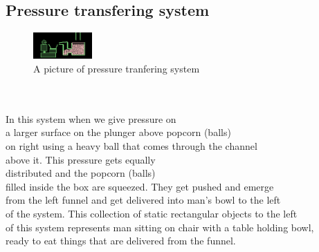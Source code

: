 \subsection{Pressure transfering system}
\begin{figure}
	\caption{A picture of pressure tranfering system}
	\centering
	 \includegraphics[width=0.2\textwidth]{./doc/pascal.png}%
\end{figure}
\begin{frame}
\centering
\\
\\
In this system when we give pressure on \\a larger surface on the plunger above popcorn (balls) \\on right using a heavy ball that comes through the channel \\above it. This pressure gets equally\\ distributed and the popcorn (balls)\\ filled inside the box are squeezed. They get pushed and emerge\\ from the left funnel and get delivered into man's bowl to the left \\of the system. This collection of static rectangular objects to the left\\ of this system represents man sitting on chair with a table holding bowl, \\ready to eat things that are delivered from the funnel.
\end{frame}
\\
\\
\\
\\
\newpage
